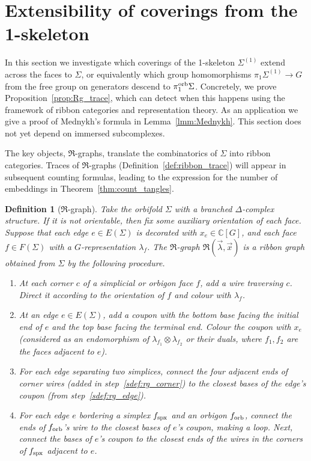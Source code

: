 \documentclass{amsart}
\newtheorem{definition}[conjecture]{Definition}
\newcommand{\pio}{\pi_1^{\textnormal{orb}}}
\newcommand{\tn}{\textnormal}
\begin{document}
\section{Extensibility of coverings from the 1-skeleton}\label{sec:extensibility}

In this section we investigate which coverings of the 1-skeleton $\Sigma^{(1)}$ extend across the faces to $\Sigma$, or equivalently which group homomorphisms $\pi_1\Sigma^{(1)}\to G$ from the free group on generators descend to $\pio\Sigma$. Concretely, we prove Proposition~\ref{prop:Rg_trace}, which can detect when this happens using the framework of ribbon categories and representation theory. As an application we give a proof of Mednykh's formula in Lemma~\ref{lmm:Mednykh}. This section does not yet depend on immersed subcomplexes.

The key objects, $\mathfrak{R}$-graphs, translate the combinatorics of $\Sigma$ into ribbon categories. Traces of $\mathfrak{R}$-graphs (Definition~\ref{def:ribbon_trace}) will appear in subsequent counting formulas, leading to the expression for the number of embeddings in Theorem~\ref{thm:count_tangles}.
\begin{definition}[$\mathfrak{R}$-graph]\label{def:R_graph}
Take the orbifold $\Sigma$ with a branched $\Delta$-complex structure. If it is not orientable, then fix some auxiliary orientation of each face. Suppose that each edge $e\in E(\Sigma)$ is decorated with $x_e\in\mathbb{C}[G]$, and each face $f\in F(\Sigma)$ with a $G$-representation $\lambda_f$. The \emph{$\mathfrak{R}$-graph} $\mathfrak{R}\left(\vec{\lambda},\vec{x}\right)$ is a ribbon graph obtained from $\Sigma$ by the following procedure.
\begin{enumerate}
\item\label{sdef:rg_corner} At each corner $c$ of a simplicial or orbigon face $f$, add a wire traversing $c$. Direct it according to the orientation of $f$ and colour with $\lambda_f$.
\item\label{sdef:rg_edge} At an edge $e\in E(\Sigma)$, add a coupon with the bottom base facing the initial end of $e$ and the top base facing the terminal end. Colour the coupon with $x_e$ (considered as an endomorphism of $\lambda_{f_1}\otimes\lambda_{f_2}$ or their duals, where $f_1,f_2$ are the faces adjacent to $e$).
\item\label{sdef:rg_spx_conn} For each edge separating two simplices, connect the four adjacent ends of corner wires (added in step~\ref*{sdef:rg_corner}) to the closest bases of the edge's coupon (from step~\ref*{sdef:rg_edge}).
\item\label{sdef:rg_orbi_conn} For each edge $e$ bordering a simplex $f_\tn{spx}$ and an orbigon $f_\tn{orb}$, connect the ends of $f_\tn{orb}$'s wire to the closest bases of $e$'s coupon, making a loop. Next, connect the bases of $e$'s coupon to the closest ends of the wires in the corners of $f_\tn{spx}$ adjacent to $e$.
\end{enumerate}
\end{definition}
\end{document}
